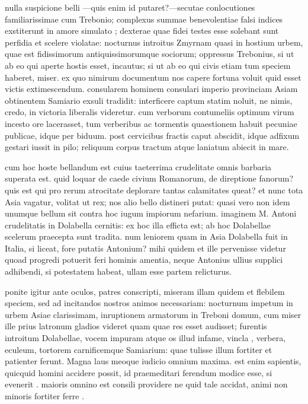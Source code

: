  nulla suspicione belli —quis enim id putaret?—secutae conlocutiones familiarissimae cum Trebonio; complexus summae benevolentiae falsi indices exstiterunt in amore simulato ; dexterae quae fidei testes esse solebant sunt perfidia et scelere violatae: nocturnus introitus Zmyrnam quasi in hostium urbem, quae est fidissimorum antiquissimorumque sociorum; oppressus Trebonius, si ut ab eo qui aperte hostis esset, incautus; si ut ab eo qui civis etiam tum speciem haberet, miser. ex quo nimirum documentum nos capere fortuna voluit quid esset victis extimescendum. consularem hominem consulari imperio provinciam Asiam obtinentem Samiario exsuli tradidit: interficere captum statim noluit, ne nimis, credo, in victoria liberalis videretur. cum verborum contumeliis optimum virum incesto ore lacerasset, tum verberibus ac tormentis quaestionem habuit pecuniae publicae, idque per biduum. post cervicibus fractis caput abscidit, idque adfixum gestari iussit in pilo; reliquum corpus tractum atque laniatum abiecit in mare.

 cum hoc hoste bellandum est cuius taeterrima crudelitate omnis barbaria superata est. quid loquar de caede civium Romanorum, de direptione fanorum? quis est qui pro rerum atrocitate deplorare tantas calamitates queat? et nunc tota Asia vagatur, volitat ut rex; nos alio bello distineri putat: quasi vero non idem unumque bellum sit contra hoc iugum impiorum nefarium. imaginem M. Antoni crudelitatis in Dolabella cernitis: ex hoc illa efficta est; ab hoc Dolabellae scelerum praecepta sunt tradita. num leniorem quam in Asia Dolabella fuit in Italia, si liceat, fore putatis Antonium? mihi quidem et ille pervenisse videtur quoad progredi potuerit feri hominis amentia, neque Antonius ullius supplici adhibendi, si potestatem habeat, ullam esse partem relicturus.

 ponite igitur ante oculos, patres conscripti, miseram illam quidem et flebilem speciem, sed ad incitandos nostros animos necessariam: nocturnum impetum in urbem Asiae clarissimam, inruptionem armatorum in Treboni domum, cum miser ille prius latronum gladios videret quam quae res esset audisset; furentis introitum Dolabellae, vocem impuram atque os illud infame, vincla , verbera, eculeum, tortorem carnificemque Samiarium: quae tulisse illum fortiter et patienter ferunt. Magna laus meoque iudicio omnium maxima. est enim sapientis, quicquid homini accidere possit, id praemeditari ferendum modice esse, si evenerit . maioris omnino est consili providere ne quid tale accidat, animi non minoris fortiter ferre .

